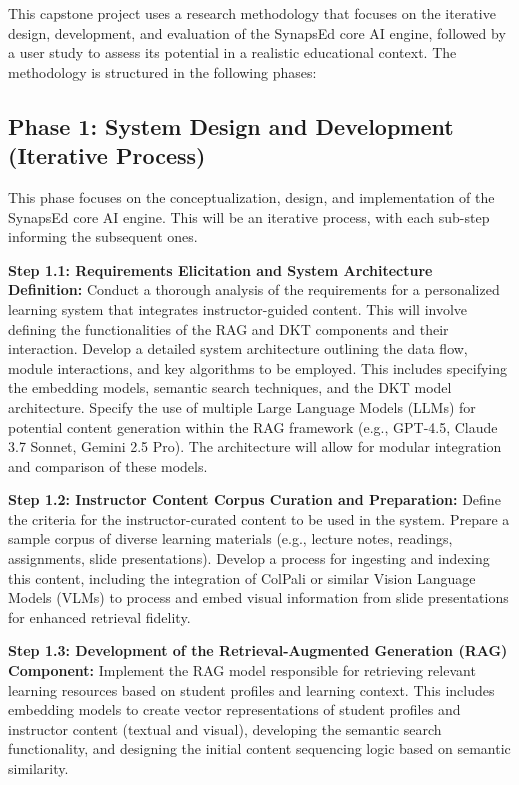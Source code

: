 \documentclass{stylefiles/capstone}
\begin{document}
This capstone project uses a research methodology that focuses on the iterative design, development, and evaluation of the SynapsEd core AI engine, followed by a user study to assess its potential in a realistic educational context. The methodology is structured in the following phases:

\subsection{Phase 1: System Design and Development (Iterative Process)}

This phase focuses on the conceptualization, design, and implementation of the SynapsEd core AI engine. This will be an iterative process, with each sub-step informing the subsequent ones.

\textbf{Step 1.1: Requirements Elicitation and System Architecture Definition:}  
Conduct a thorough analysis of the requirements for a personalized learning system that integrates instructor-guided content. This will involve defining the functionalities of the RAG and DKT components and their interaction. Develop a detailed system architecture outlining the data flow, module interactions, and key algorithms to be employed. This includes specifying the embedding models, semantic search techniques, and the DKT model architecture. Specify the use of multiple Large Language Models (LLMs) for potential content generation within the RAG framework (e.g., GPT-4.5, Claude 3.7 Sonnet, Gemini 2.5 Pro). The architecture will allow for modular integration and comparison of these models.

\textbf{Step 1.2: Instructor Content Corpus Curation and Preparation:}  
Define the criteria for the instructor-curated content to be used in the system. Prepare a sample corpus of diverse learning materials (e.g., lecture notes, readings, assignments, slide presentations). Develop a process for ingesting and indexing this content, including the integration of ColPali\cite{faysse2025colpaliefficientdocumentretrieval} or similar Vision Language Models (VLMs) to process and embed visual information from slide presentations for enhanced retrieval fidelity.

\textbf{Step 1.3: Development of the Retrieval-Augmented Generation (RAG) Component:}  
Implement the RAG model responsible for retrieving relevant learning resources based on student profiles and learning context. This includes embedding models to create vector representations of student profiles and instructor content (textual and visual), developing the semantic search functionality, and designing the initial content sequencing logic based on semantic similarity.
\end{document}
